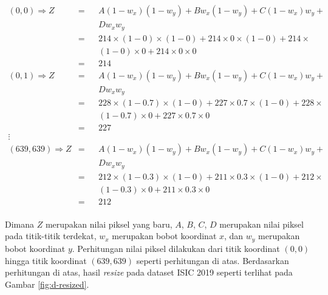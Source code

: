     \begin{align*}
        (0,0) \Rightarrow Z     &=  &&A (1-w_x) (1-w_y) + B w_x (1-w_y) + C (1-w_x) w_y + \\
                                &   &&D w_x w_y\\
                                &=  &&214\times (1-0)\times (1-0) + 214\times 0\times (1-0) + 214 \times \\
                                &   &&(1-0)\times 0 + 214\times 0\times 0\\
                                &=  &&214\\
        (0,1) \Rightarrow Z     &=  &&A (1-w_x) (1-w_y) + B w_x (1-w_y) + C (1-w_x) w_y + \\
                                &   &&D w_x w_y\\
                                &=  &&228\times (1-0.7)\times (1-0) + 227\times 0.7\times (1-0) + 228 \times \\
                                &   &&(1-0.7)\times 0 + 227\times 0.7\times 0\\
                                &=  &&227\\
        \vdots\\
        (639,639) \Rightarrow Z &=  &&A (1-w_x) (1-w_y) + B w_x (1-w_y) + C (1-w_x) w_y + \\
                                &   &&D w_x w_y\\
                                &=  &&212\times (1-0.3)\times (1-0) + 211\times 0.3\times (1-0) + 212 \times \\
                                &   &&(1-0.3)\times 0 + 211\times 0.3\times 0\\
                                &=  &&212\\
    \end{align*}
    
    Dimana $Z$ merupakan nilai piksel yang baru, $A$, $B$, $C$, $D$ merupakan nilai piksel pada titik-titik terdekat, $w_x$ merupakan bobot koordinat $x$, dan $w_y$ merupakan bobot koordinat $y$. Perhitungan nilai piksel dilakukan dari titik koordinat $(0, 0)$ hingga titik koordinat $(639, 639)$ seperti perhitungan di atas. Berdasarkan perhitungan di atas, hasil \textit{resize} pada dataset ISIC 2019 seperti terlihat pada Gambar \ref{fig:d-resized}.

